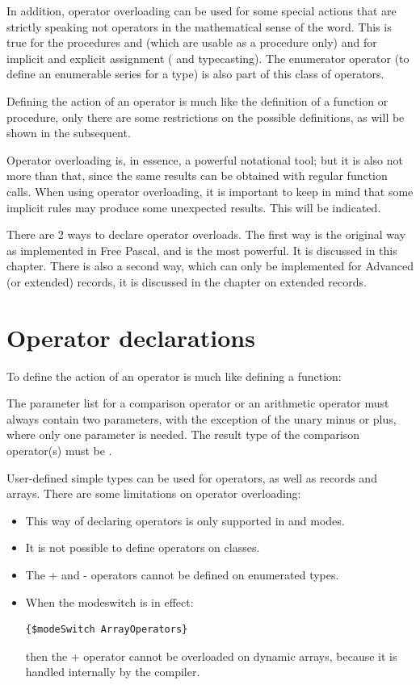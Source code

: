 In addition, operator overloading can be used for some special actions
that are strictly speaking not operators in the mathematical sense of the word.
This is true for the procedures  and  (which are usable as
a procedure only) and for implicit and explicit assignment (\var{:=} and typecasting).
The enumerator operator (to define an enumerable series for a type) is also
part of this class of operators.

Defining the action of an operator is much like the definition of a
function or procedure, only there are some restrictions on the possible
definitions, as will be shown in the subsequent.

Operator overloading is, in essence, a powerful notational tool;
but it is also not more than that, since the same results can be
obtained with regular function calls. When using operator overloading,
it is important to keep in mind that some implicit rules may produce
some unexpected results. This will be indicated.

There are 2 ways to declare operator overloads. The first way is the
original way as implemented in Free Pascal, and is the most powerful.
It is discussed in this chapter. There is also a second way, which can only
be implemented for Advanced (or extended) records, it is discussed in the
chapter on extended records.

\section{Operator declarations}
To define the action of an operator is much like defining a function:

The parameter list for a comparison operator or an arithmetic operator
must always contain two parameters, with the exception of the unary minus or
plus, where only one parameter is needed. The result type of the comparison
operator(s) must be .



User-defined simple types can be used for operators, as well as records and arrays.
There are some limitations on operator overloading:
\begin{itemize}
\item This way of declaring operators is only supported in  and
 modes.
\item It is not possible to define operators on classes.
\item The + and - operators cannot be defined on enumerated types.
\item When the  modeswitch is in effect:
\begin{verbatim}
{$modeSwitch ArrayOperators}
\end{verbatim}
then the + operator cannot be overloaded on dynamic arrays, because it is handled internally
by the compiler.
\end{itemize}

